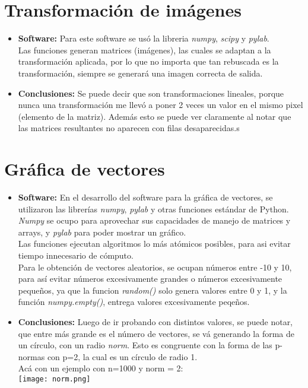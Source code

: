 \documentclass[12pt,letterpaper]{article}
\begin{document}
\section{Transformación de imágenes}
\begin{itemize}
\item \textbf{Software:} Para este software se usó la libreria \textit{numpy}, \textit{scipy} y \textit{pylab}.\\
Las funciones generan matrices (imágenes), las cuales se adaptan a la transformación aplicada, por lo que no importa que tan rebuscada es la transformación, siempre se generará una imagen correcta de salida.
\item \textbf{Conclusiones:} Se puede decir que son transformaciones lineales, porque nunca una transformación me llevó a poner 2 veces un valor en el mismo pixel (elemento de la matriz). Además esto se puede ver claramente al notar que las matrices resultantes no aparecen con filas desaparecidas.s
\end{itemize}

\section{Gráfica de vectores}
\begin{itemize}
\item \textbf{Software:} En el desarrollo del software para la gráfica de vectores, se utilizaron las librerías \textit{numpy}, \textit{pylab} y otras funciones estándar de Python. \textit{Numpy} se ocupo para aprovechar sus capacidades de manejo de matrices y arrays, y \textit{pylab} para poder mostrar un gráfico.\\
Las funciones ejecutan algoritmos lo más atómicos posibles, para asi evitar tiempo innecesario de cómputo.\\
Para le obtención de vectores aleatorios, se ocupan números entre -10 y 10, para así evitar números excesivamente grandes o números excesivamente pequeños, ya que la funcion \textit{random()} solo genera valores entre 0 y 1, y la función \textit{numpy.empty()}, entrega valores excesivamente peqeños.
\item \textbf{Conclusiones:} Luego de ir probando con distintos valores, se puede notar, que entre más grande es el número de vectores, se vá generando la forma de un círculo, con un radio \textit{norm}. Esto es congruente con la forma de las p-normas con p=2, la cual es un círculo de radio 1.\\
Acá con un ejemplo con n=1000 y norm = 2:\\\texttt{[image: norm.png]}

\end{itemize}
\end{document}
